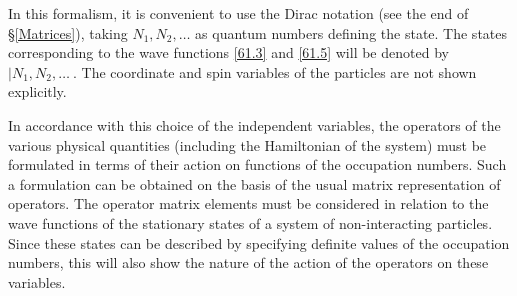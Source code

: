 In this formalism, it is convenient to use the Dirac notation (see the end of \S\ref{Matrices}), taking $ N_1, N_2, \dots $ as quantum numbers defining the state. The states corresponding to the wave functions \eqref{61.3} and \eqref{61.5} will be denoted by $ \left|N_1, N_2, \dots\> $. The coordinate and spin variables of the particles are not shown explicitly.

In accordance with this choice of the independent variables, the operators of the various physical quantities (including the Hamiltonian of the system) must be formulated in terms of their action on functions of the occupation numbers. Such a formulation can be obtained on the basis of the usual matrix representation of operators. The operator matrix elements must be considered in relation to the wave functions of the stationary states of a system of non-interacting particles. Since these states can be described by specifying definite values of the occupation numbers, this will also show the nature of the action of the operators on these variables.

